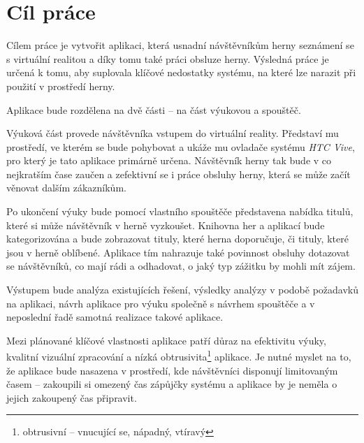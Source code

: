 \chapter{Cíl práce}\label{cuxedl-pruxe1ce}

Cílem práce je vytvořit aplikaci, která usnadní návštěvníkům
herny seznámení se s virtuální realitou a díky tomu také práci obsluze herny.
Výsledná práce je určená k tomu, aby suplovala klíčové nedostatky
systému, na které lze narazit při použití v prostředí herny.

Aplikace bude rozdělena na dvě části -- na část výukovou a spouštěč.

Výuková část provede návštěvníka vstupem do virtuální reality. Představí mu prostředí, ve kterém se bude pohybovat a ukáže mu ovladače systému \emph{HTC Vive}, pro který je tato aplikace
primárně určena. Návštěvník herny tak bude v co nejkratším čase zaučen a
zefektivní se i práce obsluhy herny, která se může začít věnovat dalším zákazníkům.

Po ukončení výuky bude pomocí vlastního spouštěče představena nabídka
titulů, které si může návštěvník v herně vyzkoušet. Knihovna her a
aplikací bude kategorizována a bude zobrazovat tituly, které
herna doporučuje, či tituly, které jsou v herně oblíbené. Aplikace tím nahrazuje také povinnost obsluhy dotazovat se návštěvníků, co mají rádi a
odhadovat, o jaký typ zážitku by mohli mít zájem.

Výstupem bude analýza existujících řešení, výsledky analýzy v podobě
požadavků na aplikaci, návrh aplikace pro výuku společně s návrhem
spouštěče a v neposlední řadě samotná realizace takové aplikace.

Mezi plánované klíčové vlastnosti aplikace patří důraz na efektivitu výuky,
kvalitní vizuální zpracování a nízká obtrusivita\footnote{obtrusivní -- vnucující se, nápadný, vtíravý} aplikace. Je nutné
myslet na to, že aplikace bude nasazena v prostředí, kde návštěvníci
disponují limitovaným časem -- zakoupili si omezený čas zápůjčky systému
a aplikace by je neměla o jejich zakoupený čas připravit.
